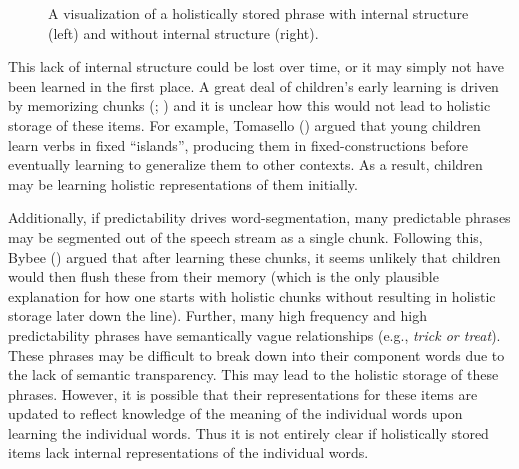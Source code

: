 \documentclass[
  12pt,
  letterpaper,
]{scrreprt}
\begin{document}
\begin{figure}[htbp]

\caption{\label{fig-nointernalstructure}A visualization of a
holistically stored phrase with internal structure (left) and without
internal structure (right).}


\end{figure}%

This lack of internal structure could be lost over time, or it may
simply not have been learned in the first place. A great deal of
children's early learning is driven by memorizing chunks
(;
) and it is unclear how this would not lead to holistic storage of
these items. For example, Tomasello
()
argued that young children learn verbs in fixed ``islands'', producing
them in fixed-constructions before eventually learning to generalize
them to other contexts. As a result, children may be learning holistic
representations of them initially.

Additionally, if predictability drives word-segmentation, many
predictable phrases may be segmented out of the speech stream as a
single chunk. Following this, Bybee ()
argued that after learning these chunks, it seems unlikely that children
would then flush these from their memory (which is the only plausible
explanation for how one starts with holistic chunks without resulting in
holistic storage later down the line). Further, many high frequency and
high predictability phrases have semantically vague relationships (e.g.,
\emph{trick or treat}). These phrases may be difficult to break down
into their component words due to the lack of semantic transparency.
This may lead to the holistic storage of these phrases. However, it is
possible that their representations for these items are updated to
reflect knowledge of the meaning of the individual words upon learning
the individual words. Thus it is not entirely clear if holistically
stored items lack internal representations of the individual words.
\end{document}
